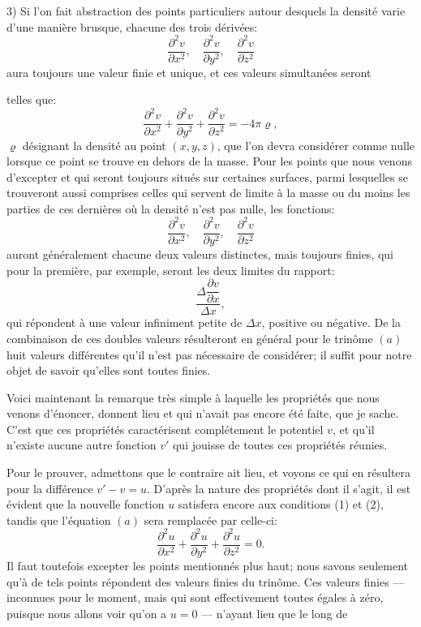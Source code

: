 \documentclass[11pt]{article}
\begin{document}
3) Si l'on fait abstraction des points particuliers autour desquels la densité varie d'une manière brusque, chacune des trois dérivées:
\[
\frac{\partial^2 v}{\partial x^2},\quad \frac{\partial^2 v}{\partial y^2},\quad \frac{\partial^2 v}{\partial z^2}
\]
aura toujours une valeur finie et unique, et ces valeurs simultanées seront

telles que:
\begin{equation}\tag{a}
\frac{\partial^2 v}{\partial x^2}+\frac{\partial^2 v}{\partial y^2}+\frac{\partial^2 v}{\partial z^2}=-4\pi\varrho,
\end{equation}
$\varrho$ désignant la densité au point $(x,y,z)$, que l'on devra considérer comme nulle lorsque ce point se trouve en dehors de la masse. Pour les points que nous venons d'excepter et qui seront toujours situés sur certaines surfaces, parmi lesquelles se trouveront aussi comprises celles qui servent de limite à la masse ou du moins les parties de ces dernières où la densité n'est pas nulle, les fonctions:
\[
\frac{\partial^2 v}{\partial x^2},\quad \frac{\partial^2 v}{\partial y^2},\quad \frac{\partial^2 v}{\partial z^2}
\]
auront généralement chacune deux valeurs distinctes, mais toujours finies, qui pour la première, par exemple, seront les deux limites du rapport:
\[
\frac{\Delta\dfrac{\partial v}{\partial x}}{\Delta x},
\]
qui répondent à une valeur infiniment petite de $\Delta x$, positive ou négative. De la combinaison de ces doubles valeurs résulteront en général pour le trinôme $(a)$ huit valeurs différentes qu'il n'est pas nécessaire de considérer; il suffit pour notre objet de savoir qu'elles sont toutes finies.

Voici maintenant la remarque très simple à laquelle les propriétés que nous venons d'énoncer, donnent lieu et qui n'avait pas encore été faite, que je sache. C'est que ces propriétés caractérisent complétement le potentiel $v$, et qu'il n'existe aucune autre fonction $v'$ qui jouisse de toutes ces propriétés réunies.

Pour le prouver, admettons que le contraire ait lieu, et voyons ce qui en résultera pour la différence $v'-v=u$. D'après la nature des propriétés dont il s'agit, il est évident que la nouvelle fonction $u$ satisfera encore aux conditions (1) et (2), tandis que l'équation $(a)$ sera remplacée par celle-ci:
\[
\frac{\partial^2 u}{\partial x^2}+\frac{\partial^2 u}{\partial y^2}+\frac{\partial^2 u}{\partial z^2}=0.
\]
Il faut toutefois excepter les points mentionnés plus haut; nous savons seulement qu'à de tels points répondent des valeurs finies du trinôme. Ces valeurs finies --- inconnues pour le moment, mais qui sont effectivement toutes égales à zéro, puisque nous allons voir qu'on a $u=0$ --- n'ayant lieu que le long de
\end{document}
